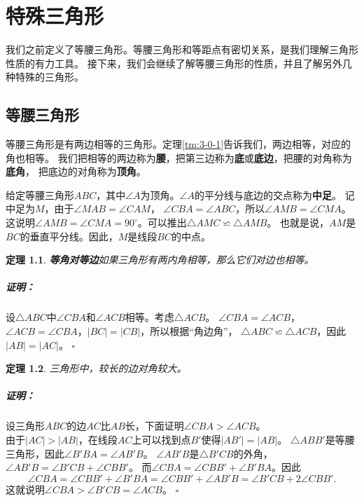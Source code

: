 \documentclass[12pt,UTF8]{ctexbook}
\newtheorem{tm}{定理}[section]
\newenvironment{proof2}{\paragraph{\textbf{证明：}}}{\hfill$\square$}
\begin{document}
\chapter{特殊三角形}
我们之前定义了等腰三角形。等腰三角形和等距点有密切关系，是我们理解三角形性质的有力工具。
接下来，我们会继续了解等腰三角形的性质，并且了解另外几种特殊的三角形。

\section{等腰三角形}
等腰三角形是有两边相等的三角形。定理\ref{tm:3-0-1}告诉我们，两边相等，对应的角也相等。
我们把相等的两边称为\textbf{腰}，把第三边称为\textbf{底}或\textbf{底边}，把腰的对角称为\textbf{底角}，
把底边的对角称为\textbf{顶角}。

给定等腰三角形$ABC$，其中$\angle A$为顶角。$\angle A$的平分线与底边的交点称为\textbf{中足}。
记中足为$M$，由于$\angle MAB = \angle CAM$，
$\angle CBA = \angle ABC$，所以$\angle AMB = \angle CMA$。
这说明$\angle AMB = \angle CMA = 90^\circ$。可以推出$\triangle AMC \backsimeq \triangle AMB$。
也就是说，$AM$是$BC$的垂直平分线。因此，$M$是线段$BC$的中点。

\begin{tm}{\textbf{等角对等边}}\label{tm:4-0-0}
    如果三角形有两内角相等，那么它们对边也相等。
\end{tm}
\begin{proof2}
    设$\triangle ABC$中$\angle CBA$和$\angle ACB$相等。考虑$\triangle ACB$。
    $\angle CBA = \angle ACB$，$\angle ACB = \angle CBA$，$|BC| = |CB|$，所以根据“角边角”，
    $\triangle ABC \backsimeq \triangle ACB$，因此$|AB| = |AC|$。
\end{proof2}

\begin{tm}\label{tm:4-0-1}
    三角形中，较长的边对角较大。
\end{tm}

\begin{proof2}
    设三角形$ABC$的边$AC$比$AB$长，下面证明$\angle CBA > \angle ACB$。\\
    由于$|AC| > |AB|$，在线段$AC$上可以找到点$B'$使得$|AB'| = |AB|$。
    $\triangle ABB'$是等腰三角形，因此$\angle B'BA = \angle AB'B$。
    $\angle AB'B$是$\triangle B'CB$的外角，$\angle AB'B = \angle B'CB + \angle CBB'$。
    而$\angle CBA = \angle CBB' + \angle B'BA$。因此
    $$ \angle CBA = \angle CBB' + \angle B'BA = \angle CBB' + \angle AB'B = \angle B'CB + 2\angle CBB'.$$
    这就说明$\angle CBA > \angle B'CB = \angle ACB$。
\end{proof2}
\end{document}
